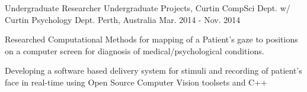 \begin{cventries}
\cventry
    {Undergraduate Researcher} %
    {Undergraduate Projects, Curtin CompSci Dept. w/ Curtin Psychology Dept.} %
    {Perth, Australia} %
    {Mar. 2014 - Nov. 2014} %
    {
      \begin{cvitems} %
        \item {Researched Computational Methods for mapping of a Patient’s gaze to positions on a computer screen for diagnosis of medical/psychological conditions.}
        \item {Developing a software based delivery system for stimuli and recording of patient’s face in real-time using Open Source Computer Vision toolsets and C++}
      \end{cvitems}
    }

\end{cventries}
